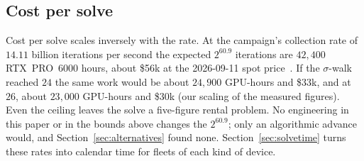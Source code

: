 \subsection{Cost per solve}
\label{sec:bounds-cost}

Cost per solve scales inversely with the rate. At the campaign's
collection rate of $14.11$ billion iterations per second the expected
$2^{60.9}$ iterations are $42{,}400$ RTX~PRO~6000 hours, about \$56k at the
2026-09-11 spot price~. If the $\sigma$-walk reached
$24$ the same work would be about $24{,}900$ GPU-hours and \$33k, and at
$26$, about $23{,}000$ GPU-hours and \$30k (our scaling of the measured
figures). Even the ceiling leaves the solve a five-figure rental
problem. No engineering in this paper or in the bounds above changes
the $2^{60.9}$; only an algorithmic advance would, and
Section~\ref{sec:alternatives} found none. Section~\ref{sec:solvetime} turns these rates
into calendar time for fleets of each kind of device.
